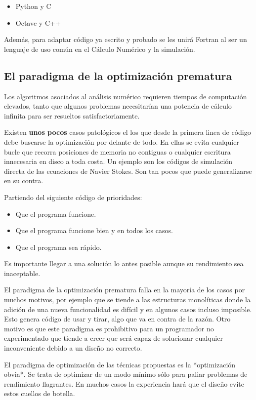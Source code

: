 \begin{itemize}
 \item Python y C
 \item Octave y C++
\end{itemize}

Además, para adaptar código ya escrito y probado se les unirá Fortran
al ser un lenguaje de uso común en el Cálculo Numérico y la simulación.


\subsection{El paradigma de la optimización prematura}

Los algoritmos asociados al análisis numérico requieren tiempos de
computación elevados, tanto que algunos problemas necesitarían una
potencia de cálculo infinita para ser resueltos satisfactoriamente.

Existen \textbf{unos pocos} casos patológicos el los que desde la primera linea
de código debe buscarse la optimización por delante de todo.  En ellas
se evita cualquier bucle que recorra posiciones de memoria no
contiguas o cualquier escritura innecesaria en disco a toda costa. Un
ejemplo son los códigos de simulación directa de las ecuaciones de
Navier Stokes. Son tan pocos que puede generalizarse en su contra.

Partiendo del siguiente código de prioridades:

\begin{itemize}
 \item Que el programa funcione.
 \item Que el programa funcione bien y en todos los casos.
 \item Que el programa sea rápido.
\end{itemize}

Es importante llegar a una solución lo antes posible aunque su
rendimiento sea inaceptable.

El paradigma de la optimización prematura falla en la mayoría de los
casos por muchos motivos, por ejemplo que se tiende a las estructuras
monolíticas donde la adición de una nueva funcionalidad es difícil y
en algunos casos incluso imposible.  Esto genera código de usar y
tirar, algo que va en contra de la razón.  Otro motivo es que este
paradigma es prohibitivo para un programador no experimentado que
tiende a creer que será capaz de solucionar cualquier inconveniente
debido a un diseño no correcto.

El paradigma de optimización de las técnicas propuestas es la
*optimización obvia*.  Se trata de optimizar de un modo mínimo sólo
para paliar problemas de rendimiento flagrantes.  En muchos casos la
experiencia hará que el diseño evite estos cuellos de botella.

